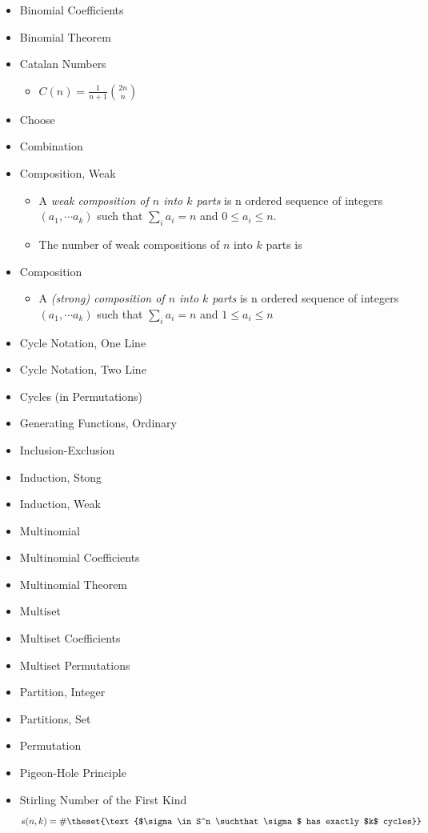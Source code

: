 \begin{itemize}
\tightlist
\item
  Binomial Coefficients
\item
  Binomial Theorem
\item
  Catalan Numbers

  \begin{itemize}
  \tightlist
  \item
    \(C(n) = \frac 1 {n+1} {{2n}\choose{n}}\)
  \end{itemize}
\item
  Choose
\item
  Combination
\item
  Composition, Weak

  \begin{itemize}
  \tightlist
  \item
    A \emph{weak composition of \(n\) into \(k\) parts} is n ordered
    sequence of integers \((a_1, \cdots a_k)\) such that
    \(\sum_i a_i = n\) and \(0 \leq a_i \leq n\).
  \item
    The number of weak compositions of \(n\) into \(k\) parts is
  \end{itemize}
\item
  Composition

  \begin{itemize}
  \tightlist
  \item
    A \emph{(strong) composition of \(n\) into \(k\) parts} is n ordered
    sequence of integers \((a_1, \cdots a_k)\) such that
    \(\sum_i a_i = n\) and \(1 \leq a_i \leq n\)
  \end{itemize}
\item
  Cycle Notation, One Line
\item
  Cycle Notation, Two Line
\item
  Cycles (in Permutations)
\item
  Generating Functions, Ordinary
\item
  Inclusion-Exclusion
\item
  Induction, Stong
\item
  Induction, Weak
\item
  Multinomial
\item
  Multinomial Coefficients
\item
  Multinomial Theorem
\item
  Multiset
\item
  Multiset Coefficients
\item
  Multiset Permutations
\item
  Partition, Integer
\item
  Partitions, Set
\item
  Permutation
\item
  Pigeon-Hole Principle
\item
  Stirling Number of the First Kind
  \begin{align*}
  s(n, k) = \#\theset{\text{$\sigma \in S^n \suchthat \sigma$ has exactly $k$ cycles}}
  \end{align*}


\end{itemize}
